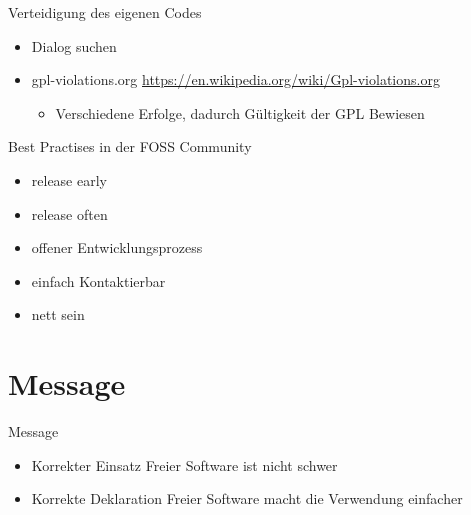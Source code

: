\begin{frame}{Verteidigung des eigenen Codes}
	\begin{itemize}
		\item Dialog suchen
		\item gpl-violations.org \url{https://en.wikipedia.org/wiki/Gpl-violations.org}
		\begin{itemize}
			\item Verschiedene Erfolge, dadurch Gültigkeit der GPL Bewiesen
		\end{itemize}
	\end{itemize}
\end{frame}

\begin{frame}{Best Practises in der FOSS Community}
	\begin{itemize}
		\item release early
		\item release often
		\item offener Entwicklungsprozess
		\item einfach Kontaktierbar
		\item nett sein
	\end{itemize}
\end{frame}

\section{Message}
\begin{frame}{Message}
	\begin{itemize}
		\item Korrekter Einsatz Freier Software ist nicht schwer
		\item Korrekte Deklaration Freier Software macht die Verwendung einfacher
	\end{itemize}
\end{frame}

